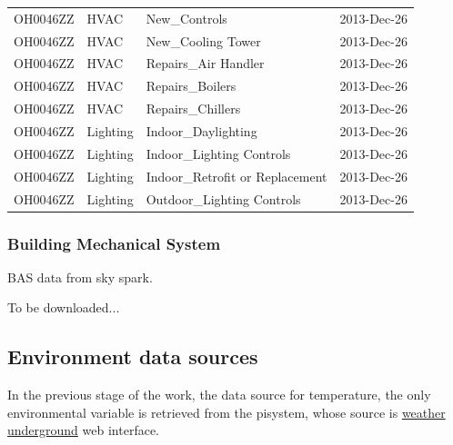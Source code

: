\documentclass[12pt]{article}
\begin{document}
\begin{longtable}{lp{4cm}p{4cm}p{3cm}}
OH0046ZZ         & HVAC                                    & New\_Controls                             & 2013-Dec-26           \\
OH0046ZZ         & HVAC                                    & New\_Cooling Tower                        & 2013-Dec-26           \\
OH0046ZZ         & HVAC                                    & Repairs\_Air Handler                      & 2013-Dec-26           \\
OH0046ZZ         & HVAC                                    & Repairs\_Boilers                          & 2013-Dec-26           \\
OH0046ZZ         & HVAC                                    & Repairs\_Chillers                         & 2013-Dec-26           \\
OH0046ZZ         & Lighting                                & Indoor\_Daylighting                       & 2013-Dec-26           \\
OH0046ZZ         & Lighting                                & Indoor\_Lighting Controls                 & 2013-Dec-26           \\
OH0046ZZ         & Lighting                                & Indoor\_Retrofit or Replacement           & 2013-Dec-26           \\
OH0046ZZ         & Lighting                                & Outdoor\_Lighting Controls                & 2013-Dec-26          \\
\hline
\end{longtable}
\FloatBarrier
\subsubsection{Building Mechanical System}
BAS data from sky spark.

To be downloaded...
\subsection{Environment data sources}
In the previous stage of the work, the data source for temperature,
the only environmental variable is retrieved from the pisystem, whose
source is \href{https://www.wunderground.com/}{weather
  underground} web interface. 
\end{document}
